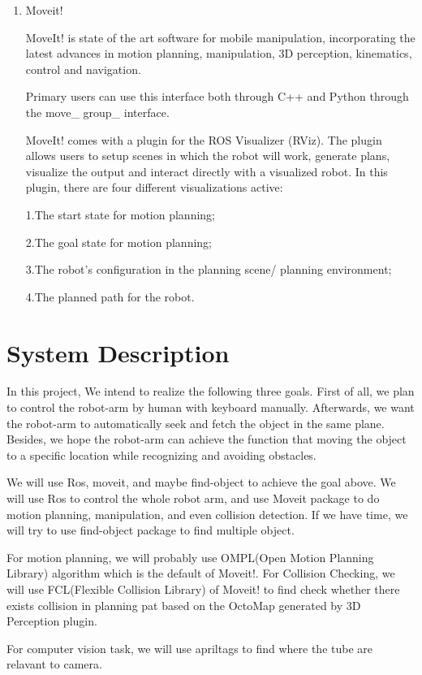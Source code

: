 \documentclass[10pt,twocolumn,letterpaper]{article}
\begin{document}
\begin{enumerate}
\item Moveit!

MoveIt! is state of the art software for mobile manipulation, incorporating the latest advances in motion planning, manipulation, 3D perception, kinematics, control and navigation. \par
Primary users can use this interface both through C++ and Python through the move\_ group\_ interface.\par
MoveIt! comes with a plugin for the ROS Visualizer (RViz). The plugin allows users to setup scenes in which the robot will work, generate plans, visualize the output and interact directly with a visualized robot. In this plugin, there are four  different visualizations active:\par
1.The start state for motion planning;\par
2.The goal state for motion planning;\par
3.The robot’s configuration in the planning scene/ planning environment;\par
4.The planned path for the robot.\par
\end{enumerate}

\section{System	Description}

In this project, We intend to realize the following three goals. First of all, we plan to control the robot-arm by human with keyboard manually. Afterwards, we want the robot-arm to automatically seek and fetch the object in the same plane. Besides, we hope the robot-arm can achieve the function that moving the object to a specific location while recognizing and avoiding obstacles.

We will use Ros, moveit, and maybe find-object to achieve the goal above. We will use Ros to control the whole robot arm, and use Moveit package to do motion planning, manipulation, and even collision detection. If we have time, we will try to use find-object package to find multiple object.

For motion planning, we will probably use OMPL(Open Motion Planning Library) algorithm which is the default of Moveit!. For Collision Checking, we will use FCL(Flexible Collision Library) of Moveit! to find check whether there exists collision in planning pat based on the OctoMap generated by 3D Perception plugin.

For computer vision task,  we will use apriltags to find where the tube are relavant to camera.
\end{document}
